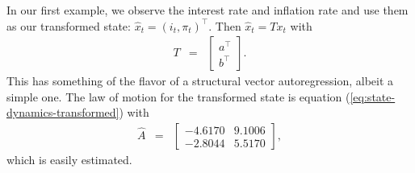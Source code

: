 \documentclass[12pt]{article}
\begin{document}
{In our first example, we observe the interest rate and inflation rate
and use them as our transformed state: $\hat{x}_t = (i_t,\pi_t)^\top$.
Then $\hat{x}_t = T x_t$ with
\begin{eqnarray*}
    T &=&
        \left[
        \begin{array}{c}
        a^\top \\ b^\top
        \end{array}
        \right] .
\end{eqnarray*}
This has something of the flavor of a structural vector autoregression,
albeit a simple one.
The law of motion for the transformed state is equation (\ref{eq:state-dynamics-transformed})
with
\begin{eqnarray*}
    \widehat{A} &=&
       \left[
        \begin{array}{rr}
         -4.6170 &   9.1006 \\  -2.8044  &  5.5170
        \end{array}
        \right] ,
\end{eqnarray*}
which is easily estimated.

}
\end{document}
